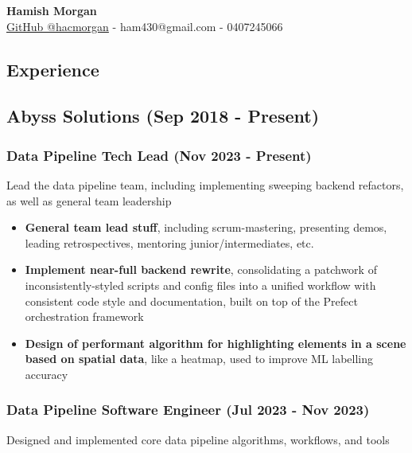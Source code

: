 \documentclass[12pt]{article}
\begin{document}
\begin{center}
  \Large
  \vspace{0.8cm}
  \textbf{Hamish Morgan}\\
  \vspace{0.8cm}
  \large
  \href{https://github.com/hacmorgan}{GitHub @hacmorgan} - ham430@gmail.com - 0407245066

\end{center}


\begin{FlushLeft}

  \section{Experience}

  \subsection{Abyss Solutions (Sep 2018 - Present)}

  \subsubsection{Data Pipeline Tech Lead (Nov 2023 - Present)}
  Lead the data pipeline team, including implementing sweeping backend refactors, as well as general team leadership \\

  \begin{itemize}
  \item \textbf{General team lead stuff}, including scrum-mastering, presenting demos, leading retrospectives, mentoring junior/intermediates, etc. \\
  \item \textbf{Implement near-full backend rewrite}, consolidating a patchwork of inconsistently-styled scripts and config files into a unified workflow with consistent code style and documentation, built on top of the Prefect orchestration framework \\
  \item \textbf{Design of performant algorithm for highlighting elements in a scene based on spatial data}, like a heatmap, used to improve ML labelling accuracy \\
  \end{itemize}

  \subsubsection{Data Pipeline Software Engineer (Jul 2023 - Nov 2023)}
  Designed and implemented core data pipeline algorithms, workflows, and tools \\


\end{FlushLeft}
\end{document}
